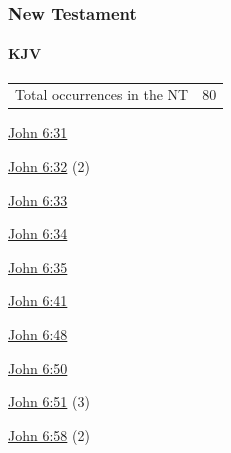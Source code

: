 			
		
		
	\subsubsection{New Testament} %
		\label{BREAD-NT}
	
		\paragraph{KJV}
			\label{BREAD-NT-KJV}		
	
			\begin{tabular}{ll}
				Total occurrences in the NT & 80
			\end{tabular}
			
			\begin{compactdesc}
				\item[{\hyperref[JOHN-6-31]{John 6:31}}]
				\item[{\hyperref[JOHN-6-32]{John 6:32}}] (2)
				\item[{\hyperref[JOHN-6-33]{John 6:33}}]
				\item[{\hyperref[JOHN-6-34]{John 6:34}}]
				\item[{\hyperref[JOHN-6-35]{John 6:35}}]
				\item[{\hyperref[JOHN-6-41]{John 6:41}}]
				\item[{\hyperref[JOHN-6-48]{John 6:48}}]
				\item[{\hyperref[JOHN-6-50]{John 6:50}}]
				\item[{\hyperref[JOHN-6-51]{John 6:51}}] (3)
				\item[{\hyperref[JOHN-6-58]{John 6:58}}] (2)
			\end{compactdesc}
			
		
